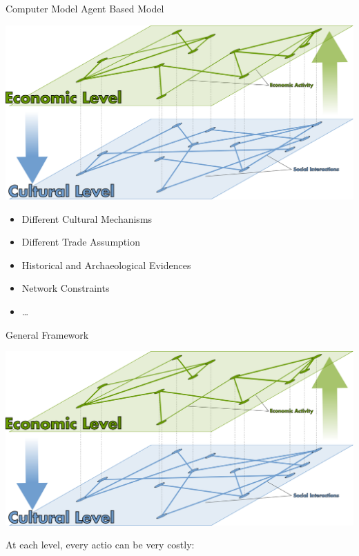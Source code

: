 \documentclass[10pt, notes=show]{beamer}
\begin{document}
\begin{frame}{Computer Model}
    \vfill
    Agent Based Model
    \begin{center}
	\includegraphics[width=.5\textwidth]{images/cooev.png}	
    \end{center}
    \vfill
	\begin{itemize}
	\item Different Cultural Mechanisms
    \vfill
	\item Different Trade Assumption
    \vfill
	\item Historical and Archaeological Evidences 
    \vfill
	\item Network Constraints
    \vfill
	\item \dots
    \vfill
	\end{itemize}
\end{frame}
	



\begin{frame}{General Framework}
    \begin{center}
	\includegraphics[width=.8\textwidth]{images/cooev.png}	
    \end{center}
    At each level, every actio can be very costly:
    \begin{itemize}
    \end{itemize}
\end{frame}
\end{document}
